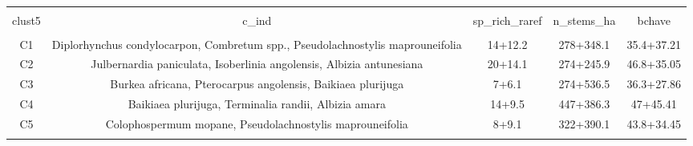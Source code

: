 
\begin{table}[!htbp] \centering 
  \caption{} 
  \label{clust_summ} 
\begin{tabular}{@{\extracolsep{5pt}} ccccc} 
\\[-1.8ex]\hline 
\hline \\[-1.8ex] 
clust5 & c\_ind & sp\_rich\_raref & n\_stems\_ha & bchave \\ 
\hline \\[-1.8ex] 
C1 & Diplorhynchus condylocarpon, Combretum spp., Pseudolachnostylis maprouneifolia & 14+12.2 & 278+348.1 & 35.4+37.21 \\ 
C2 & Julbernardia paniculata, Isoberlinia angolensis, Albizia antunesiana & 20+14.1 & 274+245.9 & 46.8+35.05 \\ 
C3 & Burkea africana, Pterocarpus angolensis, Baikiaea plurijuga & 7+6.1 & 274+536.5 & 36.3+27.86 \\ 
C4 & Baikiaea plurijuga, Terminalia randii, Albizia amara & 14+9.5 & 447+386.3 & 47+45.41 \\ 
C5 & Colophospermum mopane, Pseudolachnostylis maprouneifolia & 8+9.1 & 322+390.1 & 43.8+34.45 \\ 
\hline \\[-1.8ex] 
\end{tabular} 
\end{table} 
